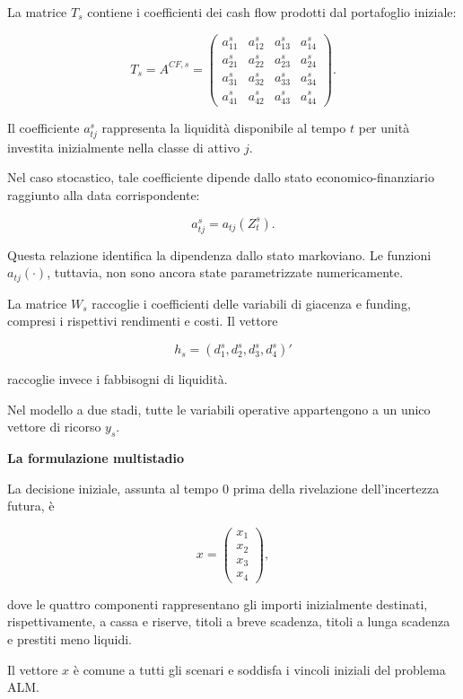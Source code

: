 La matrice $T_s$ contiene i coefficienti
dei cash flow prodotti dal portafoglio iniziale:

\[
T_s=A^{CF,s}
=
\begin{pmatrix}
a_{11}^s&a_{12}^s&a_{13}^s&a_{14}^s\\
a_{21}^s&a_{22}^s&a_{23}^s&a_{24}^s\\
a_{31}^s&a_{32}^s&a_{33}^s&a_{34}^s\\
a_{41}^s&a_{42}^s&a_{43}^s&a_{44}^s
\end{pmatrix}.
\]

Il coefficiente $a_{tj}^s$ rappresenta la liquidit\`a
disponibile al tempo $t$ per unit\`a investita
inizialmente nella classe di attivo $j$.

Nel caso stocastico, tale coefficiente dipende
dallo stato economico-finanziario raggiunto
alla data corrispondente:

\[
a_{tj}^s=a_{tj}(Z_t^s).
\]

Questa relazione identifica la dipendenza
dallo stato markoviano. Le funzioni
$a_{tj}(\cdot)$, tuttavia, non sono
ancora state parametrizzate numericamente.

La matrice $W_s$ raccoglie i coefficienti
delle variabili di giacenza e funding,
compresi i rispettivi rendimenti e costi.
Il vettore

\[
h_s=(d_1^s,d_2^s,d_3^s,d_4^s)'
\]

raccoglie invece i fabbisogni di liquidit\`a.

Nel modello a due stadi, tutte le variabili
operative appartengono a un unico vettore
di ricorso $y_s$.

\medskip

\noindent
\medskip

\noindent
\textbf{La formulazione multistadio}

La decisione iniziale, assunta al tempo $0$ prima
della rivelazione dell'incertezza futura, \`e

\[
x=
\begin{pmatrix}
x_1\\
x_2\\
x_3\\
x_4
\end{pmatrix},
\]

dove le quattro componenti rappresentano
gli importi inizialmente destinati, rispettivamente,
a cassa e riserve, titoli a breve scadenza,
titoli a lunga scadenza e prestiti meno liquidi.

Il vettore $x$ \`e comune a tutti gli scenari
e soddisfa i vincoli iniziali del problema ALM.

